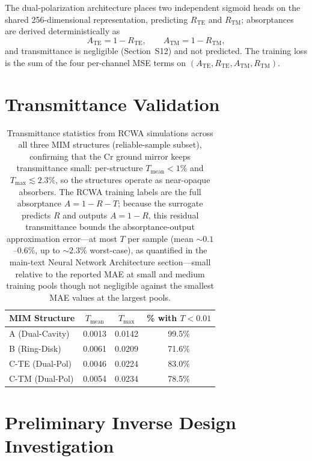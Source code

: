 \documentclass[11pt]{article}
\begin{document}
The dual-polarization architecture places two independent sigmoid heads on the shared 256-dimensional representation, predicting $R_\text{TE}$ and $R_\text{TM}$; absorptances are derived deterministically as
\[
A_\text{TE} = 1 - R_\text{TE}, \qquad A_\text{TM} = 1 - R_\text{TM},
\]
and transmittance is negligible (Section~S12) and not predicted. The training loss is the sum of the four per-channel MSE terms on $(A_\text{TE}, R_\text{TE}, A_\text{TM}, R_\text{TM})$.


\section{Transmittance Validation}
\label{sec:si_transmittance}

\begin{table}[htbp]\centering\small
\caption{Transmittance statistics from RCWA simulations across all three MIM structures (reliable-sample subset), confirming that the Cr ground mirror keeps transmittance small: per-structure $T_\text{mean} < 1\%$ and $T_\text{max} \lesssim 2.3\%$, so the structures operate as near-opaque absorbers. The RCWA training labels are the full absorptance $A = 1 - R - T$; because the surrogate predicts $R$ and outputs $A = 1 - R$, this residual transmittance bounds the absorptance-output approximation error---at most $T$ per sample (mean ${\sim}0.1$--$0.6\%$, up to ${\sim}2.3\%$ worst-case), as quantified in the main-text Neural Network Architecture section---small relative to the reported MAE at small and medium training pools though not negligible against the smallest MAE values at the largest pools.}
\label{tab:transmittance}
\begin{tabular}{lccc}\toprule
\textbf{MIM Structure} & $T_\text{mean}$ & $T_\text{max}$ & \textbf{\% with $T < 0.01$}\\\midrule
A (Dual-Cavity)  & 0.0013 & 0.0142 & 99.5\%\\
B (Ring-Disk)    & 0.0061 & 0.0209 & 71.6\%\\
C-TE (Dual-Pol)  & 0.0046 & 0.0224 & 83.0\%\\
C-TM (Dual-Pol)  & 0.0054 & 0.0234 & 78.5\%\\\bottomrule
\end{tabular}
\end{table}


\section{Preliminary Inverse Design Investigation}
\label{sec:si_inverse}
\end{document}
